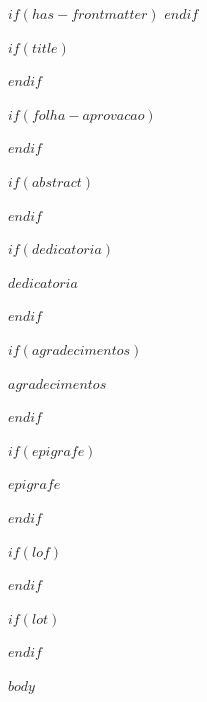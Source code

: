 $if(has-frontmatter)$
\frontmatter
$endif$

$if(title)$
\maketitle
$endif$

$if(folha-aprovacao)$

$endif$

$if(abstract)$
\begin{abstract}
$abstract$
\end{abstract}
$endif$

$if(dedicatoria)$
\begin{dedicatoria}
$dedicatoria$
\end{dedicatoria}
$endif$

$if(agradecimentos)$
\begin{agradecimentos}
$agradecimentos$
\end{agradecimentos}
$endif$

$if(epigrafe)$
\begin{epigrafe}
$epigrafe$
\end{epigrafe}
$endif$

{
\hypersetup{linkcolor=black}
\tableofcontents
}

$if(lof)$
\listoffigures
$endif$

$if(lot)$
\listoftables
$endif$

$body$
